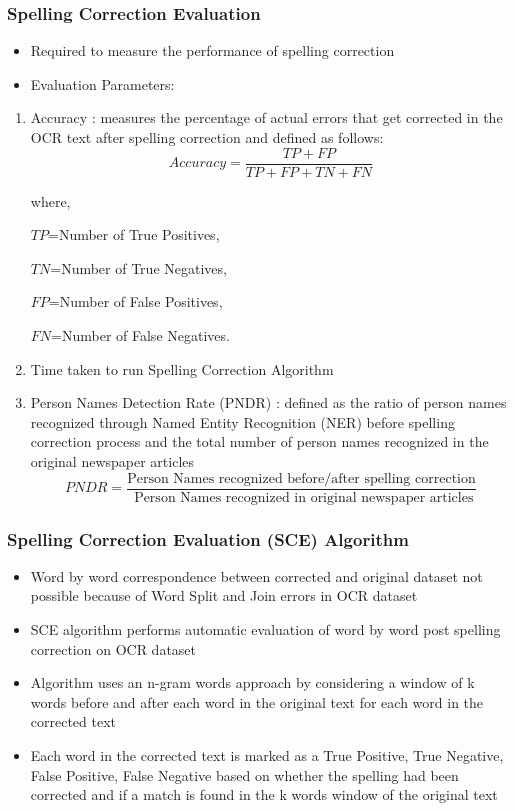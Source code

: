 \documentclass{beamer}
\begin{document}
\begin{frame}[allowframebreaks]
\frametitle{Spelling Correction Evaluation}

\begin{itemize}
\item
Required to measure the performance of spelling correction\\ \vspace{0.2in}
\item
Evaluation Parameters:
\end{itemize}
\begin{enumerate}
\item \alert{ Accuracy} : measures the percentage of actual errors that get corrected in the OCR text after spelling correction and defined as follows:
$$Accuracy=  \dfrac{TP+FP} {TP+ FP + TN + FN}$$


where, 

$TP$=Number of True Positives,

$TN$=Number of True Negatives,

 $FP$=Number of False Positives,

 $FN$=Number of False Negatives.



\item \alert{Time taken} to run Spelling Correction Algorithm
\item \alert{Person Names Detection Rate} (PNDR) : defined as the ratio of person names recognized through Named Entity Recognition (NER) before spelling correction process and the total number of person names recognized in the original newspaper articles
$$PNDR=\dfrac{ \text{Person Names recognized before/after spelling correction}} {\text{ Person Names recognized in original newspaper articles}} $$
\end{enumerate}
\end{frame}


\begin{frame}
\frametitle{Spelling Correction Evaluation (SCE) Algorithm}
\begin{itemize}
\item Word by word correspondence between corrected and original dataset not possible because of Word Split and Join errors in OCR dataset
\item SCE algorithm performs automatic evaluation of word by word post  spelling correction on OCR dataset 
\item Algorithm uses an n-gram words approach by considering a window of k words before and after each word in the original text for each word in the corrected text
\item Each word in the corrected text is marked as a True Positive, True Negative, False Positive, False Negative based on whether the spelling had been corrected and if a match is found in the k words window of the original text
\end{itemize}
\end{frame}
\end{document}
